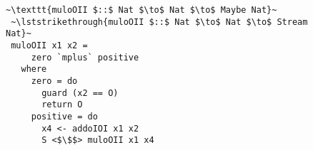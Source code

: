 
\begin{figure}[!t]
  \centering
  \begin{minipage}{\columnwidth}
    \begin{lstlisting}[]
 ~\texttt{muloOII $::$ Nat $\to$ Nat $\to$ Maybe Nat}~
 ~\lststrikethrough{muloOII $::$ Nat $\to$ Nat $\to$ Stream Nat}~
 muloOII x1 x2 =
     zero `mplus` positive
   where
     zero = do
       guard (x2 == O)
       return O
     positive = do
       x4 <- addoIOI x1 x2
       S <$\$$> muloOII x1 x4
    \end{lstlisting}
  \end{minipage}
\end{figure}